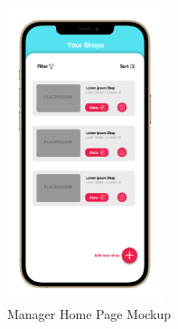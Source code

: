 \begin{figure}[h!]
    \centering
    \includegraphics[width=0.405\textwidth]{Images/UserInterfaces/withiphonephrames/ManagerHomePage_iphone12promaxgold_portrait.png}
    \caption{\label{fig:InterfacesDiagram}{Manager Home Page Mockup}}
\end{figure}